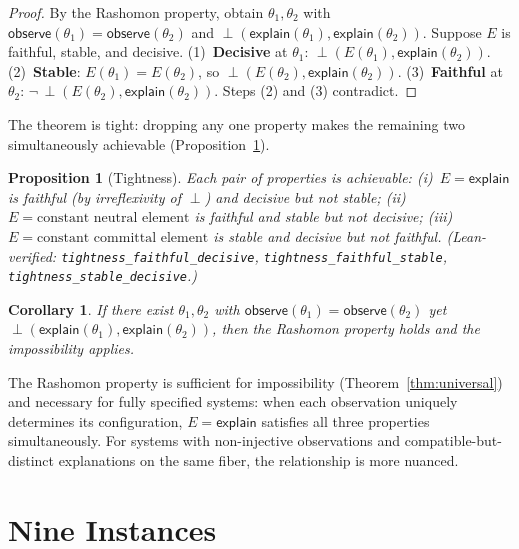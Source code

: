 \documentclass{article}
\newtheorem{corollary}{Corollary}
\newtheorem{proposition}{Proposition}
\newcommand{\incomp}{\perp}
\begin{document}
\begin{proof}
By the Rashomon property, obtain $\theta_1, \theta_2$ with
$\mathsf{observe}(\theta_1) = \mathsf{observe}(\theta_2)$ and
$\incomp(\mathsf{explain}(\theta_1), \mathsf{explain}(\theta_2))$.
Suppose $E$ is faithful, stable, and decisive.
(1)~\textbf{Decisive} at $\theta_1$: $\incomp(E(\theta_1), \mathsf{explain}(\theta_2))$.
(2)~\textbf{Stable}: $E(\theta_1) = E(\theta_2)$, so $\incomp(E(\theta_2), \mathsf{explain}(\theta_2))$.
(3)~\textbf{Faithful} at $\theta_2$: $\neg\,\incomp(E(\theta_2), \mathsf{explain}(\theta_2))$.
Steps (2) and (3) contradict.
\end{proof}

The theorem is tight: dropping any one property makes the remaining two simultaneously achievable (Proposition~\ref{prop:tightness}).

\begin{proposition}[Tightness]
\label{prop:tightness}
Each pair of properties is achievable:
(i)~$E = \mathsf{explain}$ is faithful (by irreflexivity of $\incomp$) and decisive but not stable;
(ii)~$E = \text{constant neutral element}$ is faithful and stable but not decisive;
(iii)~$E = \text{constant committal element}$ is stable and decisive but not faithful.
(Lean-verified: \texttt{tightness\_faithful\_decisive}, \texttt{tightness\_faithful\_stable}, \texttt{tightness\_stable\_decisive}.)
\end{proposition}

\begin{corollary}
\label{cor:decidable}
If there exist $\theta_1, \theta_2$ with
$\mathsf{observe}(\theta_1) = \mathsf{observe}(\theta_2)$ yet
$\incomp(\mathsf{explain}(\theta_1), \mathsf{explain}(\theta_2))$, then
the Rashomon property holds and the impossibility applies.
\end{corollary}

The Rashomon property is sufficient for impossibility (Theorem~\ref{thm:universal})
and necessary for fully specified systems: when each observation uniquely determines
its configuration, $E = \mathsf{explain}$ satisfies all three properties simultaneously.
For systems with non-injective observations and compatible-but-distinct explanations
on the same fiber, the relationship is more nuanced.



\section{Nine Instances}
\label{sec:instances}
\end{document}
